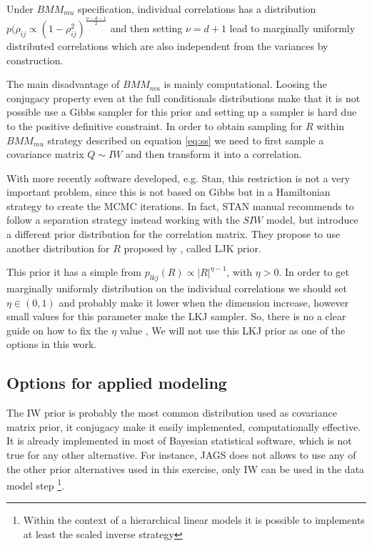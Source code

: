\documentclass[a4paper]{article}
\begin{document}
Under $BMM_{mu}$ specification, individual correlations has a distribution $p(\rho_{ij} \propto (1-\rho_{ij}^2)^{\frac{\nu-d-1}{2}}$ and then setting $\nu=d+1$ lead to marginally uniformly distributed correlations which are also independent from the variances by construction. 

The main disadvantage of $BMM_{mu}$ is mainly computational. Loosing the conjugacy property even at the full conditionals distributions make that it is not possible use a Gibbs sampler for this prior and setting up a sampler is hard due to the positive definitive constraint. In order to obtain sampling for $R$ within $BMM_{mu}$ strategy described on equation \ref{eq:ss} we need to first sample a covariance matrix $Q \sim IW$ and then transform it  into a correlation. 

With more recently software developed, e.g. Stan, \citep{stan2014} this restriction is not a very important problem, since this is not based on Gibbs but in a Hamiltonian strategy to create the MCMC iterations.  In fact, STAN manual \citep{stanmanual2014} recommends to follow a separation strategy instead working with the $SIW$ model, but introduce a different prior distribution for the correlation matrix. They propose to use another distribution for $R$ proposed by \cite{lewandowski2009generating}, called LJK prior.   

This prior it has a simple from $p_{lkj}(R) \propto |R|^{\eta-1}$, with $\eta > 0$. In order to get marginally uniformly distribution on the individual correlations we should  set $\eta \in (0,1)$ and probably make it lower when the dimension increase, however small values for this parameter make the LKJ sampler. So, there is no a clear guide on how to fix the $\eta$ value , We will not use this LKJ prior as one of the options in this work. 

\subsection{Options for applied modeling}

The IW prior is probably the most common distribution used as covariance matrix prior, it conjugacy make it easily implemented, computationally effective. It is already implemented in most of Bayesian statistical software, which is not true for any other alternative. For instance, JAGS does not allows to use any of the other prior alternatives used in this exercise, only IW can be used in the data model step \footnote{Within the context of a hierarchical linear models it is possible to implements at least the scaled inverse strategy}.  
\end{document}

